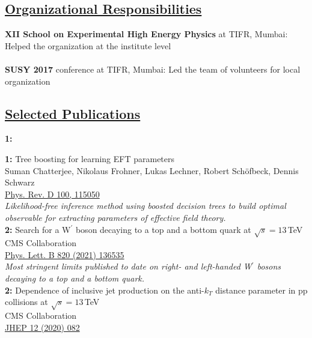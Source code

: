 \documentclass[a4paper,11pt]{article}
\begin{document}
{\subsection*{\underline{Organizational Responsibilities}}

\textbf{XII School on Experimental High Energy Physics} at TIFR, Mumbai:
Helped the organization at the institute level\\
\\
\textbf{SUSY 2017} conference at TIFR, Mumbai:
Led the team of volunteers for local organization

\subsection*{\underline{Selected Publications}}
\textbf{1:}

\textbf{1:} {Tree boosting for learning EFT parameters}\\
Suman Chatterjee, Nikolaus Frohner, Lukas Lechner, Robert Sch{\"o}fbeck, Dennis Schwarz\\
\href{https://doi.org/10.1103/PhysRevD.100.115050}{Phys. Rev. D 100, 115050}\\
\textit{Likelihood-free inference method using boosted decision trees to build optimal observable for extracting parameters of effective field theory.}\\
\textbf{2:} {
Search for a W$^\prime$ boson decaying to a top and a bottom quark at $\sqrt{s}=13$\,TeV}\\
CMS Collaboration \\
\href{https://doi.org/10.1016/j.physletb.2021.136535}{Phys. Lett. B 820 (2021) 136535} \\
\textit{Most stringent limits published to date on right- and left-handed W$^\prime$ bosons decaying to a top and a bottom quark.}\\
\textbf{2:} {
Dependence of inclusive jet production on the anti$\mbox{-}k_T$ distance parameter in pp collisions at $\sqrt{s} = 13$\,TeV}\\
CMS Collaboration \\
\href{https://doi.org/10.1007/JHEP12(2020)082}{JHEP 12 (2020) 082}\\
}
\end{document}
